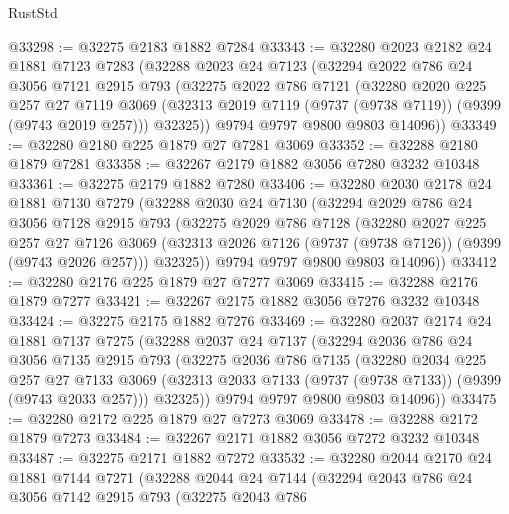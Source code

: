 \begin{lexlean}{RustStd}
\begin{coremodule}
@33298 := @32275 @2183 @1882 @7284
@33343 := @32280
    @2023
    @2182
    @24
    @1881
    @7123
    @7283
    (@32288
      @2023
      @24
      @7123
      (@32294
        @2022
        @786
        @24
        @3056
        @7121
        @2915
        @793
        (@32275
          @2022
          @786
          @7121
          (@32280
            @2020
            @225
            @257
            @27
            @7119
            @3069
            (@32313 @2019 @7119 (@9737 (@9738 @7119)) (@9399 (@9743 @2019 @257)))
            @32325))
        @9794
        @9797
        @9800
        @9803
        @14096))
@33349 := @32280 @2180 @225 @1879 @27 @7281 @3069
@33352 := @32288 @2180 @1879 @7281
@33358 := @32267 @2179 @1882 @3056 @7280 @3232 @10348
@33361 := @32275 @2179 @1882 @7280
@33406 := @32280
    @2030
    @2178
    @24
    @1881
    @7130
    @7279
    (@32288
      @2030
      @24
      @7130
      (@32294
        @2029
        @786
        @24
        @3056
        @7128
        @2915
        @793
        (@32275
          @2029
          @786
          @7128
          (@32280
            @2027
            @225
            @257
            @27
            @7126
            @3069
            (@32313 @2026 @7126 (@9737 (@9738 @7126)) (@9399 (@9743 @2026 @257)))
            @32325))
        @9794
        @9797
        @9800
        @9803
        @14096))
@33412 := @32280 @2176 @225 @1879 @27 @7277 @3069
@33415 := @32288 @2176 @1879 @7277
@33421 := @32267 @2175 @1882 @3056 @7276 @3232 @10348
@33424 := @32275 @2175 @1882 @7276
@33469 := @32280
    @2037
    @2174
    @24
    @1881
    @7137
    @7275
    (@32288
      @2037
      @24
      @7137
      (@32294
        @2036
        @786
        @24
        @3056
        @7135
        @2915
        @793
        (@32275
          @2036
          @786
          @7135
          (@32280
            @2034
            @225
            @257
            @27
            @7133
            @3069
            (@32313 @2033 @7133 (@9737 (@9738 @7133)) (@9399 (@9743 @2033 @257)))
            @32325))
        @9794
        @9797
        @9800
        @9803
        @14096))
@33475 := @32280 @2172 @225 @1879 @27 @7273 @3069
@33478 := @32288 @2172 @1879 @7273
@33484 := @32267 @2171 @1882 @3056 @7272 @3232 @10348
@33487 := @32275 @2171 @1882 @7272
@33532 := @32280
    @2044
    @2170
    @24
    @1881
    @7144
    @7271
    (@32288
      @2044
      @24
      @7144
      (@32294
        @2043
        @786
        @24
        @3056
        @7142
        @2915
        @793
        (@32275
          @2043
          @786

\end{coremodule}
\end{lexlean}
